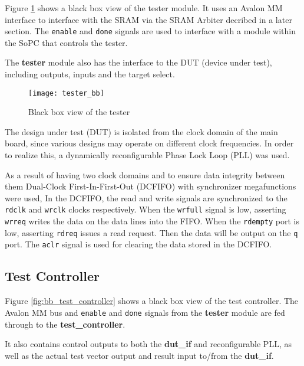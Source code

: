 Figure \ref{fig:bb_tester} shows a black box view of the tester module. It uses an Avalon MM interface
to interface with the SRAM via the SRAM Arbiter decribed in a later section. The \texttt{enable} and \texttt{done}
signals are used to interface with a module within the SoPC that controls the tester.

The \textbf{tester} module also has the interface to the DUT (device under test), including outputs, inputs and the target select.

\begin{figure}
 \centering
 \texttt{[image: tester\_bb]}
 \caption{Black box view of the tester}
 \label{fig:bb_tester}
\end{figure}


The design under test (DUT) is isolated from the clock domain of the main board,
since various designs may operate on different clock frequencies. In order to realize this,
a dynamically reconfigurable Phase Lock Loop (PLL) was used.

As a result of having two clock domains and to ensure data integrity between them Dual-Clock First-In-First-Out (DCFIFO) with synchronizer megafunctions were used,
In the DCFIFO, the read and write signals are synchronized to the \texttt{rdclk} and \texttt{wrclk} clocks respectively.
When the \texttt{wrfull} signal is low, asserting \texttt{wrreq} writes the data
on the data lines into the FIFO.
When the \texttt{rdempty} port is low, asserting \texttt{rdreq} issues a read request.
Then the data will be output on the \texttt{q} port.
The \texttt{aclr} signal is used for clearing the data stored in the DCFIFO.





\subsection{Test Controller}
Figure \ref{fig:bb_test_controller} shows a black box view of the test controller. The Avalon MM bus and
\texttt{enable} and \texttt{done} signals from the \textbf{tester} module are fed through
to the \textbf{test\_controller}.

It also contains control outputs to both the \textbf{dut\_if} and reconfigurable PLL, as well as the actual
test vector output and result input to/from the \textbf{dut\_if}.

